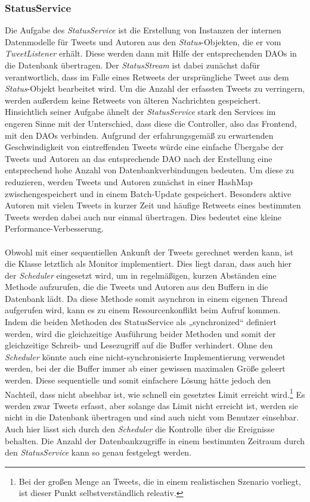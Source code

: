 \subsubsection*{StatusService}
Die Aufgabe des \textit{StatusService} ist die Erstellung von Instanzen der internen Datenmodelle für 
Tweets und Autoren aus den \textit{Status}-Objekten, die er vom \textit{TweetListener} erhält. Diese 
werden dann mit Hilfe der entsprechenden DAOs in die Datenbank übertragen. Der \textit{StatusStream} 
ist dabei zunächst dafür verantwortlich, dass im Falle eines Retweets der ursprüngliche Tweet aus dem 
\textit{Status}-Objekt bearbeitet wird. Um die Anzahl der erfassten Tweets zu verringern, werden 
außerdem keine Retweets von älteren Nachrichten gespeichert.
Hinsichtlich seiner Aufgabe ähnelt der \textit{StatusService} stark den Services im engeren Sinne mit
der Unterschied, dass diese die Controller, also das Frontend, mit den DAOs verbinden. Aufgrund der 
erfahrungsgemäß zu erwartenden Geschwindigkeit von eintreffenden Tweets würde eine einfache Übergabe 
der Tweets und Autoren an das entsprechende DAO nach der Erstellung eine entsprechend hohe Anzahl von 
Datenbankverbindungen bedeuten. Um diese zu reduzieren, werden Tweets und Autoren zunächst in einer 
HashMap zwischengespeichert und in einem Batch-Update gespeichert. Besonders aktive Autoren mit 
vielen Tweets in kurzer Zeit und häufige Retweets eines bestimmten Tweets werden dabei auch nur 
einmal übertragen. Dies bedeutet eine kleine Performance-Verbesserung.
\\\\
Obwohl mit einer sequentiellen Ankunft der Tweets gerechnet werden kann, ist die Klasse letztlich als 
Monitor implementiert. Dies liegt daran, dass auch hier der \textit{Scheduler} eingesetzt wird, um in 
regelmäßigen, kurzen Abständen eine Methode aufzurufen, die die Tweets und Autoren aus den Buffern in 
die Datenbank lädt. Da diese Methode somit asynchron in einem eigenen Thread aufgerufen wird, kann es 
zu einem Resourcenkonflikt beim Aufruf kommen. Indem die beiden Methoden des StatusService als 
„synchronized“ definiert werden, wird die gleichzeitige Ausführung beider Methoden und somit der 
gleichzeitige Schreib- und Lesezugriff auf die Buffer verhindert. Ohne den \textit{Scheduler} könnte 
auch eine nicht-synchronisierte Implementierung verwendet werden, bei der die Buffer immer ab einer 
gewissen maximalen Größe geleert werden. Diese sequentielle und somit einfachere Lösung hätte jedoch 
den Nachteil, dass nicht absehbar ist, wie schnell ein gesetztes Limit erreicht wird.\footnote{Bei
der großen Menge an Tweets, die in einem realistischen Szenario vorliegt, ist dieser Punkt 
selbstverständlich releativ.} Es werden zwar Tweets erfasst, aber solange das Limit nicht erreicht 
ist, werden sie nicht in die Datenbank übertragen und sind auch nicht vom Benutzer einsehbar. Auch
hier lässt sich durch den \textit{Scheduler} die 
Kontrolle über die Ereignisse behalten. Die Anzahl der Datenbankzugriffe in einem bestimmten Zeitraum 
durch den \textit{StatusService} kann so genau festgelegt werden.

